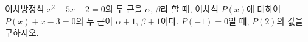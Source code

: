이차방정식 $x^2-5x+2=0$의 두 근을 $\alpha$, $\beta$라 할 때, 이차식 $P(x)$에 대하여 $P(x)+x-3=0$의 두 근이 $\alpha+1$, $\beta+1$이다. $P(-1)=0$일 때, $P(2)$의 값을 구하시오.

